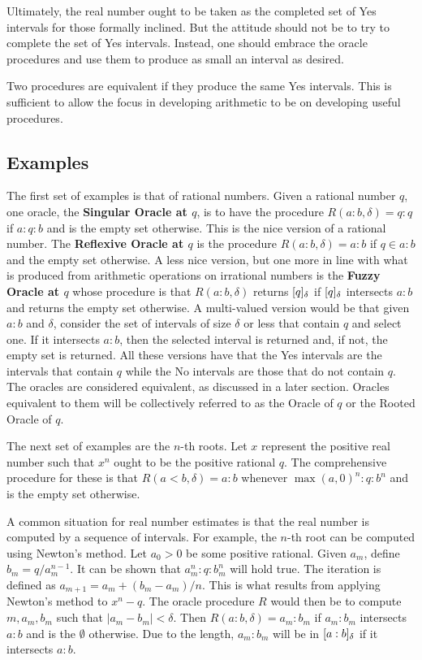 \documentclass[12pt]{article}
\begin{document}
Ultimately, the real number ought to be taken as the completed set of Yes intervals for those formally inclined. But the attitude should not be to try to complete the set of Yes intervals. Instead, one should embrace the oracle procedures and use them to produce as small an interval as desired. 

Two procedures are equivalent if they produce the same Yes intervals. This is sufficient to allow the focus in developing arithmetic to be on developing useful procedures. 

\subsection{Examples}

The first set of examples is that of rational numbers. Given a rational number $q$, one oracle, the \textbf{Singular Oracle at $q$}, is to have the procedure $R(a:b, \delta) = q:q$ if $a:q:b$ and is the empty set otherwise. This is the nice version of a rational number. The \textbf{Reflexive Oracle at $q$} is the procedure $R(a:b, \delta) = a:b$ if $q \in a:b$ and the empty set otherwise. A less nice version, but one more in line with what is produced from arithmetic operations on irrational numbers is the \textbf{Fuzzy Oracle at $q$} whose procedure is that $R(a:b, \delta)$ returns $[q]_{\delta}$ if $[q]_{\delta}$ intersects $a:b$ and returns the empty set otherwise. A multi-valued version would be that given $a:b$ and $\delta$, consider the set of intervals of size $\delta$ or less that contain $q$ and select one. If it intersects $a:b$, then the selected interval is returned and, if not, the empty set is returned. All these versions have that the Yes intervals are the intervals that contain $q$ while the No intervals are those that do not contain $q$. The oracles are considered equivalent, as discussed in a later section. Oracles equivalent to them will be collectively referred to as the Oracle of $q$ or the Rooted Oracle of $q$.  

The next set of examples are the $n$-th roots. Let $x$ represent the positive real number such that $x^n$ ought to be the positive rational $q$. The comprehensive procedure for these is that $R(a\lt b, \delta) = a:b$ whenever $\max(a, 0)^n:q:b^n$ and is the empty set otherwise.

A common situation for real number estimates is that the real number is computed by a sequence of intervals. For example, the $n$-th root can be computed using Newton's method. Let $a_0 >0$ be some positive rational. Given $a_m$, define $b_m = q/a_m^{n-1}$. It can be shown that $a_m^n : q : b_m^n$ will hold true. The iteration is defined as $a_{m+1} = a_m + (b_m - a_m)/n$. This is what results from applying Newton's method to $x^n - q$. The oracle procedure $R$ would then be to compute $m, a_m, b_m$ such that $|a_m - b_m| < \delta$.  Then $R(a:b, \delta) = a_m:b_m$ if $a_m:b_m$ intersects $a:b$ and is the $\emptyset$ otherwise. Due to the length, $a_m:b_m$ will be in $[a:b]_{\delta}$ if it intersects $a:b$. 
\end{document}
